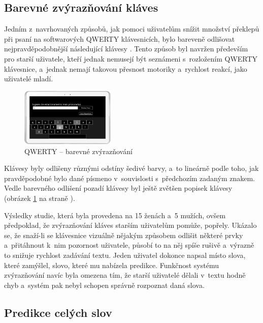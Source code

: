 \documentclass[a4paper,11pt,openany]{book} %
\begin{document}
\subsection{Barevné zvýrazňování kláves}

Jedním z~navrhovaných způsobů, jak pomoci uživatelům snížit množství překlepů při psaní na softwarových QWERTY klávesnicích, bylo bareveně odlišovat nejpravděpodobnější následující klávesy \parencite{danielgoncalves}. %
Tento způsob byl navržen především pro starší uživatele, kteří jednak nemusejí být seznámeni s~rozložením QWERTY klávesnice, a~jednak nemají takovou přesnost motoriky a~rychlost reakcí, jako uživatelé mladí. 

\begin{figure}[ht]
	\centering
	\includegraphics[width=0.4\textwidth]{qwerty_color}
	\caption{QWERTY -- barevné zvýrazňování}
	\label{fig:qwerty-color}
\end{figure}

Klávesy byly odlišeny různými odstíny šedivé barvy, a~to lineárně podle toho, jak pravděpodobné bylo dané písmeno v~souvislosti s~předchozím zadaným znakem. Vedle barevného odlišení pozadí klávesy byl ještě zvětšen popisek klávesy (obrázek \ref{fig:qwerty-color} na straně \pageref{fig:qwerty-color}). 

Výsledky studie, která byla provedena na 15 ženách a~5 mužích, ovšem předpoklad, že zvýrazňování kláves starším uživatelům pomůže, popřely. Ukázalo se, že snaží-li se klávesnice vizuálně nějakým způsobem odlišit některé prvky a~přitáhnout k~nim pozornost uživatele, působí to na něj spíše rušivě a~výrazně to snižuje rychlost zadávání textu. Jeden uživatel dokonce napsal místo slova, které zamýšlel, slovo, které mu nabízela predikce. Funkčnost systému zvýrazňování navíc byla omezena tím, že starší uživatelé dělali v~textu hodně chyb a~systém pak nebyl schopen správně rozpoznat daná slova.

\subsection{Predikce celých slov}
\end{document}
